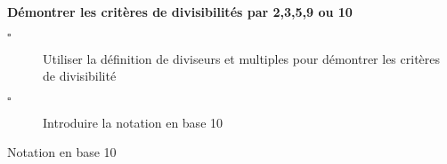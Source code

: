 \begin{titre}[Arithmetique]

\end{titre}


\begin{CpsCol}
\textbf{Démontrer les critères de divisibilités par 2,3,5,9 ou 10}
\begin{description}
\item[$\square$] Utiliser la définition de diviseurs et multiples pour démontrer les critères de divisibilité
\item[$\square$] Introduire la notation en base 10
\end{description}
\end{CpsCol}





\begin{DefT}{Notation en base 10}

\end{DefT}

\begin{Prop}

\end{Prop}

\begin{Prop}

\end{Prop}

\begin{Reg}

\end{Reg}

